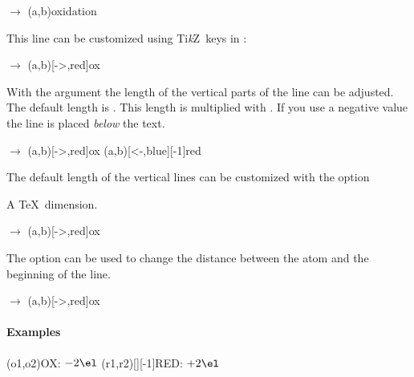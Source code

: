 \documentclass{chemmacros-manual}
\newcommand*\TikZ{Ti\textit{k}Z}
\begin{document}
\begin{example}
  \vspace{7mm}
   $\rightarrow$ \pch\redox(a,b){oxidation}
\end{example}

This line can be customized using \TikZ\ keys in :
\begin{example}
  \vspace{7mm}
   $\rightarrow$ \pch\redox(a,b)[->,red]{ox}
\end{example}

With the argument  the length of the vertical parts of the line can
be adjusted.  The default length is \code{.6em}.  This length is multiplied
with .  If you use a negative value the line is placed \emph{below}
the text.
\begin{example}
  \vspace{7mm}
   $\rightarrow$ \pch
  \redox(a,b)[->,red]{ox}
  \redox(a,b)[<-,blue][-1]{red}
  \vspace{7mm}
\end{example}

The default length of the vertical lines can be customized with the option
\begin{options}
  \Default{.6em}
    A \TeX\ dimension.
\end{options}

\begin{example}
  \vspace{7mm}
   $\rightarrow$ \pch\redox(a,b)[->,red]{ox}
\end{example}

\begin{options}
  \Default{.2em}
    The option can be used to change the distance between the atom and the
    beginning of the line.
\end{options}

\begin{example}
  \vspace{7mm}
   $\rightarrow$ \pch\redox(a,b)[->,red]{ox}
\end{example}

\paragraph{Examples}
\begin{example}
  \vspace{7mm}
  \redox(o1,o2){\small OX: $- 2\el$}
  \redox(r1,r2)[][-1]{\small RED: $+ 2\el$}
  \vspace{7mm}
\end{example}
\end{document}
